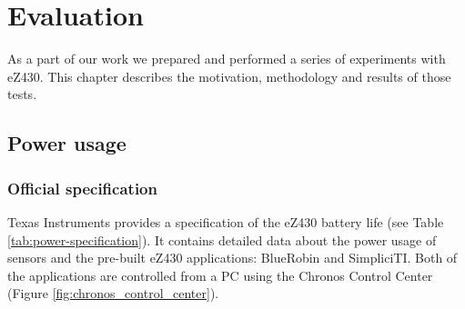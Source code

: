 \chapter{Evaluation}
\label{ch:evaluation}

As a part of our work we prepared and performed a series of experiments with eZ430.
This chapter describes the motivation, methodology and results of those tests.  

\section{Power usage}

\subsection{Official specification}
Texas Instruments provides a specification of the eZ430 battery life (see Table \ref{tab:power-specification}).
It contains detailed data about the power usage of sensors and the pre-built eZ430 applications: BlueRobin and SimpliciTI.
Both of the applications are controlled from a PC using the Chronos Control Center (Figure \ref{fig:chronos_control_center}).

